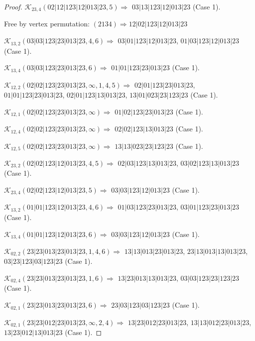 \documentclass[12pt]{article}
\theoremstyle{plain}
\theoremstyle{definition}
\theoremstyle{remark}
\newcommand{\fancy}[1]{\mathcal{#1}}
\def\K{\fancy{K}}
\begin{document}
\begin{proof}
	$\K_{23,4}(02|12|123|12|013|23,5)\Rightarrow $ $03|13|123|12|013|23$ (Case 1).
	
	
	
	Free by vertex permutation: $(2 1 3 4)\Rightarrow 12|02|123|12|013|23$
	
	
	
	\bigskip
	
	$\K_{13,2}(03|03|123|23|013|23,4, 6)\Rightarrow $ $03|01|123|12|013|23$, $01|03|123|12|013|23$ (Case 1).
	
	$\K_{13,4}(03|03|123|23|013|23,6)\Rightarrow $ $01|01|123|23|013|23$ (Case 1).
	
	
	\bigskip
	
	$\K_{12,2}(02|02|123|23|013|23,\infty,1, 4, 5)\Rightarrow $ $02|01|123|23|013|23$, $01|01|123|23|013|23$, $02|01|123|13|013|23$, $13|01|023|23|123|23$ (Case 1).
	
	$\K_{12,1}(02|02|123|23|013|23,\infty)\Rightarrow $ $01|02|123|23|013|23$ (Case 1).
	
	$\K_{12,4}(02|02|123|23|013|23,\infty)\Rightarrow $ $02|02|123|13|013|23$ (Case 1).
	
	$\K_{12,5}(02|02|123|23|013|23,\infty)\Rightarrow $ $13|13|023|23|123|23$ (Case 1).
	
	
	\bigskip
	
	$\K_{23,2}(02|02|123|12|013|23,4, 5)\Rightarrow $ $02|03|123|13|013|23$, $03|02|123|13|013|23$ (Case 1).
	
	$\K_{23,4}(02|02|123|12|013|23,5)\Rightarrow $ $03|03|123|12|013|23$ (Case 1).
	
	
	\bigskip
	
	$\K_{13,2}(01|01|123|12|013|23,4, 6)\Rightarrow $ $01|03|123|23|013|23$, $03|01|123|23|013|23$ (Case 1).
	
	$\K_{13,4}(01|01|123|12|013|23,6)\Rightarrow $ $03|03|123|12|013|23$ (Case 1).
	
	
	\bigskip
	
	$\K_{02,2}(23|23|013|23|013|23,1, 4, 6)\Rightarrow $ $13|13|013|23|013|23$, $23|13|013|13|013|23$, $03|23|123|03|123|23$ (Case 1).
	
	$\K_{02,4}(23|23|013|23|013|23,1, 6)\Rightarrow $ $13|23|013|13|013|23$, $03|03|123|23|123|23$ (Case 1).
	
	$\K_{02,1}(23|23|013|23|013|23,6)\Rightarrow $ $23|03|123|03|123|23$ (Case 1).
	
	
	\bigskip
	
	$\K_{02,1}(23|23|012|23|013|23,\infty,2, 4)\Rightarrow $ $13|23|012|23|013|23$, $13|13|012|23|013|23$, $13|23|012|13|013|23$ (Case 1).
	

\end{proof}
\end{document}
